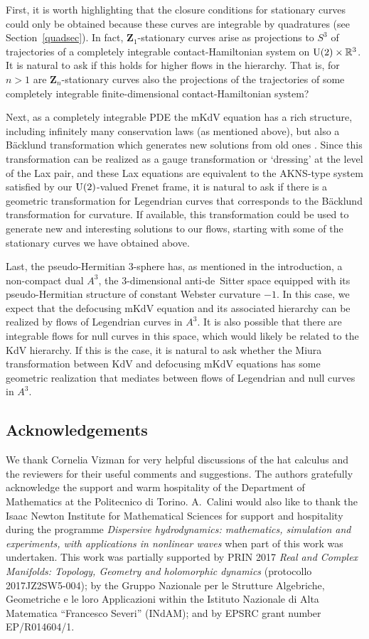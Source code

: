 \documentclass[pdftex]{sigma}
\newcommand\VZ{\mathbf Z}
\def\R{\mathbb R}
\numberwithin{equation}{section}
\begin{document}
First, it is worth highlighting that the closure conditions for stationary curves could
only be obtained because these curves are integrable by quadratures (see Section~\ref{quadsec}). In fact, $\VZ_1$-stationary curves arise as projections to $S^3$ of trajectories of a completely integrable contact-Hamiltonian system on ${\rm U}(2)\times \R^3$.
It is natural to ask if this holds for higher flows in the hierarchy. That is, for $n>1$
are $\VZ_n$-stationary curves also the projections of the trajectories of some completely integrable finite-dimensional contact-Hamiltonian system?

Next, as a completely integrable PDE the mKdV equation has a rich structure, including infinitely many conservation laws (as mentioned above), but also a B\"acklund transformation which generates new solutions from old ones \cite{KW,Wa}. Since this transformation can be realized as a gauge transformation or `dressing' at the level of the Lax pair, and these Lax equations are equivalent to the
AKNS-type system satisfied by our ${\rm U}(2)$-valued Frenet frame, it is natural to ask if
there is a geometric transformation for Legendrian curves that corresponds to the
B\"acklund transformation for curvature. If available, this transformation could be
used to generate new and interesting solutions to our flows, starting with some of the stationary curves we have obtained above.

Last, the pseudo-Hermitian 3-sphere has, as mentioned in the introduction, a non-compact dual $A^3$, the 3-dimensional
anti-de~Sitter space equipped with its pseudo-Hermitian structure of constant Webster curvature $-1$. In this case, we expect that the defocusing mKdV equation and its associated hierarchy can be realized by flows of Legendrian curves in $A^3$. It is also possible that there are integrable flows for null curves in this space, which would likely be related to the KdV hierarchy. If this is the case, it is natural to ask whether the Miura transformation \cite{Mi} between KdV and defocusing mKdV equations has some geometric realization that mediates between flows of Legendrian and null curves in $A^3$.

\subsection*{Acknowledgements}
We thank Cornelia Vizman for very helpful discussions of the hat calculus and the reviewers for their useful comments and suggestions. The authors gratefully acknowledge the support and warm hospitality of the Department of Mathematics at the Politecnico di Torino.
A.~Calini would also like to thank the Isaac Newton Institute for Mathematical Sciences for support and hospitality during the programme {\em Dispersive hydrodynamics: mathematics, simulation and experiments, with applications in nonlinear waves} when part of this work was undertaken.
This work was partially supported by PRIN 2017 {\em Real and Complex Manifolds: Topology, Geometry and holomorphic dynamics} (protocollo 2017JZ2SW5-004);
by the Gruppo Nazionale per le Strutture Algebriche, Geometriche e le loro Applicazioni within the Istituto Nazionale di Alta Matematica ``Francesco Severi'' (INdAM); and by EPSRC grant number EP/R014604/1.
\end{document}

